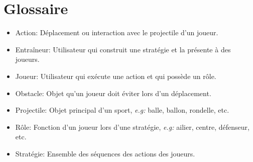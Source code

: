 %

\chapter{Glossaire}
\label{s:glossaire}

\begin{itemize}
    \item Action: Déplacement ou interaction avec le projectile d'un joueur.
        \\
    \item Entra\^ineur: Utilisateur qui construit une strat\'egie et la pr\'esente \`a des joueurs.
        \\
    \item Joueur: Utilisateur qui ex\'ecute une action et qui poss\`ede un r\^ole.
        \\
    \item Obstacle: Objet qu'un joueur doit \'eviter lors d'un d\'eplacement.
        \\
    \item Projectile: Objet principal d'un sport, \textit{e.g:} balle, ballon, rondelle, etc.
        \\
    \item R\^ole: Fonction d'un joueur lors d'une strat\'egie, \textit{e.g:} ailier, centre, d\'efenseur, etc.
        \\
    \item Stratégie: Ensemble des s\'equences des actions des joueurs.
        \\
\end{itemize}
